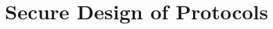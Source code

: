 \section{Secure Design of Protocols}\label{sec:security_of_cryptographic_protocols}
\vspace{7.5cm}





\vspace{-1.5mm}
\newpage
